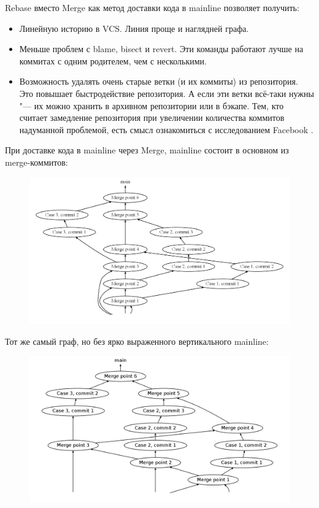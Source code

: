 \documentclass[10pt, a5paper]{article}
\begin{document}
Rebase вместо Merge как метод доставки кода в mainline позволяет получить:

\begin{itemize}
  \item Линейную историю в VCS. Линия проще и наглядней графа.
  \item Меньше проблем с blame, bisect и revert. Эти команды работают лучше на коммитах с одним родителем, чем с несколькими.
  \item Возможность удалять очень старые ветки (и их коммиты) из репозитория. Это повышает быстродействие репозитория. А если эти ветки всё-таки нужны "--- их можно хранить в архивном репозитории или в бэкапе. Тем, кто считает замедление репозитория при увеличении количества коммитов надуманной проблемой, есть смысл ознакомиться с исследованием Facebook \cite{Hlebnikov1}.
\end{itemize}

При доставке кода в mainline через Merge, mainline состоит в основном из merge-коммитов:
\begin{figure}[h!]
  \centering
  \includegraphics[scale=0.2]{02_2014_main-merged.png}
\end{figure}

Тот же самый граф, но без ярко выраженного вертикального mainline:
\begin{figure}[h!]
  \centering
  \includegraphics[scale=0.2]{02_2014_main-merged-weak-mainline.png}
\end{figure}
\end{document}
